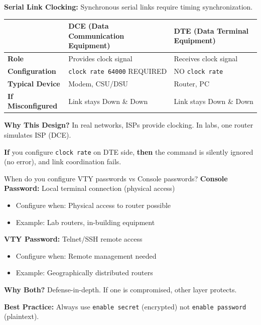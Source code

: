 \documentclass[12pt,a4paper]{article}
\begin{document}
\begin{abox}
\textbf{Serial Link Clocking:} Synchronous serial links require timing synchronization.

\begin{center}
\begin{tabularx}{\textwidth}{lXX}
\toprule
& \textbf{DCE (Data Communication Equipment)} & \textbf{DTE (Data Terminal Equipment)} \\
\midrule
\textbf{Role} & Provides clock signal & Receives clock signal \\
\textbf{Configuration} & \texttt{clock rate 64000} REQUIRED & NO \texttt{clock rate} \\
\textbf{Typical Device} & Modem, CSU/DSU & Router, PC \\
\textbf{If Misconfigured} & Link stays Down \& Down & Link stays Down \& Down \\
\bottomrule
\end{tabularx}
\end{center}

\textbf{Why This Design?} In real networks, ISPs provide clocking. In labs, one router simulates ISP (DCE).

\textbf{If} you configure \texttt{clock rate} on DTE side, \textbf{then} the command is silently ignored (no error), and link coordination fails.
\end{abox}


\begin{whenwhybox}{When do you configure VTY passwords vs Console passwords?}
\textbf{Console Password:} Local terminal connection (physical access)
\begin{itemize}
    \item Configure when: Physical access to router possible
    \item Example: Lab routers, in-building equipment
\end{itemize}

\textbf{VTY Password:} Telnet/SSH remote access
\begin{itemize}
    \item Configure when: Remote management needed
    \item Example: Geographically distributed routers
\end{itemize}

\textbf{Why Both?} Defense-in-depth. If one is compromised, other layer protects.

\textbf{Best Practice:} Always use \texttt{enable secret} (encrypted) not \texttt{enable password} (plaintext).
\end{whenwhybox}
\end{document}
